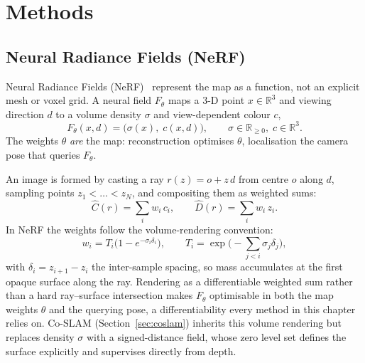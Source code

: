 \documentclass{article}
\begin{document}
\section{Methods}
\subsection{Neural Radiance Fields (NeRF)}
Neural Radiance Fields (NeRF)~\cite{Mildenhall2020} represent the map as a function, not an explicit mesh or voxel grid. A neural field $F_\theta$ maps a 3-D point $x \in \mathbb{R}^3$ and viewing direction $d$ to a volume density $\sigma$ and view-dependent colour $c$,
\begin{equation}
    F_\theta(x, d) = \big(\sigma(x),\; c(x, d)\big),
    \qquad \sigma \in \mathbb{R}_{\ge 0},\; c \in \mathbb{R}^3 .
\end{equation}
The weights $\theta$ \emph{are} the map: reconstruction optimises $\theta$, localisation the camera pose that queries $F_\theta$.

An image is formed by casting a ray $r(z) = o + z\,d$ from centre $o$ along $d$, sampling points $z_1 < \dots < z_N$, and compositing them as weighted sums:
\begin{equation}
    \hat{C}(r) = \sum_i w_i\, c_i, \qquad \hat{D}(r) = \sum_i w_i\, z_i .
    \label{eq:nerf-render}
\end{equation}
In NeRF the weights follow the volume-rendering convention:
\begin{equation}
    w_i = T_i\big(1 - e^{-\sigma_i \delta_i}\big),
    \qquad T_i = \exp\!\Big(-\!\sum_{j<i}\sigma_j \delta_j\Big),
    \label{eq:transmittance}
\end{equation}
with $\delta_i = z_{i+1} - z_i$ the inter-sample spacing, so mass accumulates at the first opaque surface along the ray. Rendering as a differentiable weighted sum rather than a hard ray--surface intersection makes $F_\theta$ optimisable in both the map weights $\theta$ and the querying pose, a differentiability every method in this chapter relies on. Co-SLAM (Section~\ref{sec:coslam}) inherits this volume rendering but replaces density $\sigma$ with a signed-distance field, whose zero level set defines the surface explicitly and supervises directly from depth.
\end{document}
